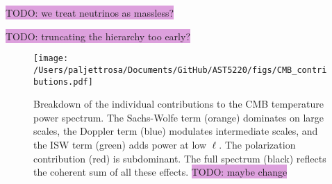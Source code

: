 \documentclass{aa}
\numberwithin{equation}{section}
\numberwithin{table}{section}
\numberwithin{figure}{section}
\begin{document}



\colorbox{Plum}{TODO: we treat neutrinos as massless?}

\colorbox{Plum}{TODO: truncating the hierarchy too early?}

\begin{figure}
  \centering
  \texttt{[image: /Users/paljettrosa/Documents/GitHub/AST5220/figs/CMB\_contributions.pdf]}
  \caption{Breakdown of the individual contributions to the CMB temperature power spectrum. The Sachs-Wolfe term (orange) dominates on large scales, the Doppler term (blue) modulates intermediate scales, and the ISW term (green) adds power at low $\ell$. The polarization contribution (red) is subdominant. The full spectrum (black) reflects the coherent sum of all these effects. \colorbox{Plum}{TODO: maybe change}}\label{fig:CMB contributions}
\end{figure}
\end{document}
